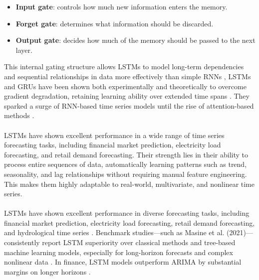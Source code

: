 \documentclass{article}
\begin{document}
\begin{itemize}
    \item \textbf{Input gate}: controls how much new information enters the memory.
\end{itemize}

\begin{itemize}
    \item \textbf{Forget gate}: determines what information should be discarded.
\end{itemize}

\begin{itemize}
    \item \textbf{Output gate}: decides how much of the memory should be passed to the next layer.
\end{itemize}

This internal gating structure allows LSTMs to model long-term dependencies and sequential relationships in data more effectively than simple RNNs \cite{ghojogh2023rnnsurvey}, LSTMs and GRUs have been shown both experimentally and theoretically to overcome gradient degradation, retaining learning ability over extended time spans \cite{mdpi2021gradient}. They sparked a surge of RNN-based time series models until the rise of attention-based methods \cite{ghojogh2023rnnsurvey}.\\
\\
LSTMs have shown excellent performance in a wide range of time series forecasting tasks, including financial market prediction, electricity load forecasting, and retail demand forecasting. Their strength lies in their ability to process entire sequences of data, automatically learning patterns such as trend, seasonality, and lag relationships without requiring manual feature engineering. This makes them highly adaptable to real-world, multivariate, and nonlinear time series. \cite{garg2022machine}\\
\\
LSTMs have shown excellent performance in diverse forecasting tasks, including financial market prediction, electricity load forecasting, retail demand forecasting, and hydrological time series \cite{neptune2019rnn,lstm_hydrology2024}. Benchmark studies—such as Masine et al. (2021)—consistently report LSTM superiority over classical methods and tree-based machine learning models, especially for long-horizon forecasts and complex nonlinear data \cite{researchgate2024sales,finance2023compare}. In finance, LSTM models outperform ARIMA by substantial margins on longer horizons \cite{siami2018arima_vs_lstm}.\\
\end{document}
